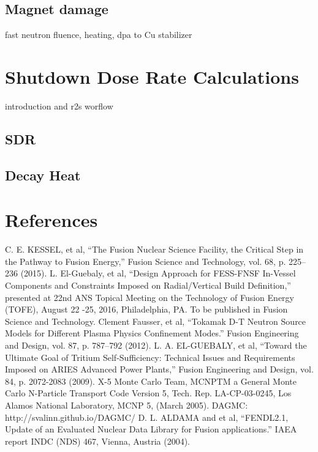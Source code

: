\documentclass[12pt, letterpaper]{elsarticle}
\begin{document}
\subsection{Magnet damage} \label{Magnet damage}
fast neutron fluence, heating, dpa to Cu stabilizer

\section{Shutdown Dose Rate Calculations} \label{Shutdown Dose Rate Calculations}
introduction and r2s worflow
\subsection{SDR} \label{SDR}
\subsection{Decay Heat} \label{Decay Heat}

\newpage
\section{References}
\begin{thebibliography}{10} 
C. E. KESSEL, et al, {“The Fusion Nuclear Science Facility, the Critical Step in the Pathway to Fusion Energy,” Fusion Science and Technology, vol. 68, p. 225–236 (2015).}
L. El-Guebaly, et al, {“Design Approach for FESS-FNSF In-Vessel Components and Constraints Imposed on Radial/Vertical Build Definition,” presented at 22nd ANS Topical Meeting on the Technology of Fusion Energy (TOFE), August 22 -25, 2016, Philadelphia, PA. To be published in Fusion Science and Technology.}
Clement Fausser, et al, {“Tokamak D-T Neutron Source Models for Different Plasma Physics Confinement Modes.” Fusion Engineering and Design, vol. 87, p. 787–792 (2012).} 
L. A. EL-GUEBALY, et al, {“Toward the Ultimate Goal of Tritium Self-Sufficiency: Technical Issues and Requirements Imposed on ARIES Advanced Power Plants,” Fusion Engineering and Design, vol. 84, p. 2072-2083 (2009).}
X-5 Monte Carlo Team, {MCNPTM a General Monte Carlo N-Particle Transport Code Version 5, Tech. Rep. LA-CP-03-0245, Los Alamos National Laboratory, MCNP 5, (March 2005).}
{DAGMC: http://svalinn.github.io/DAGMC/}
D. L. ALDAMA and et al, {“FENDL2.1, Update of an Evaluated Nuclear Data Library for Fusion applications.” IAEA report INDC (NDS) 467, Vienna, Austria (2004).}
\end{thebibliography}
\end{document}
